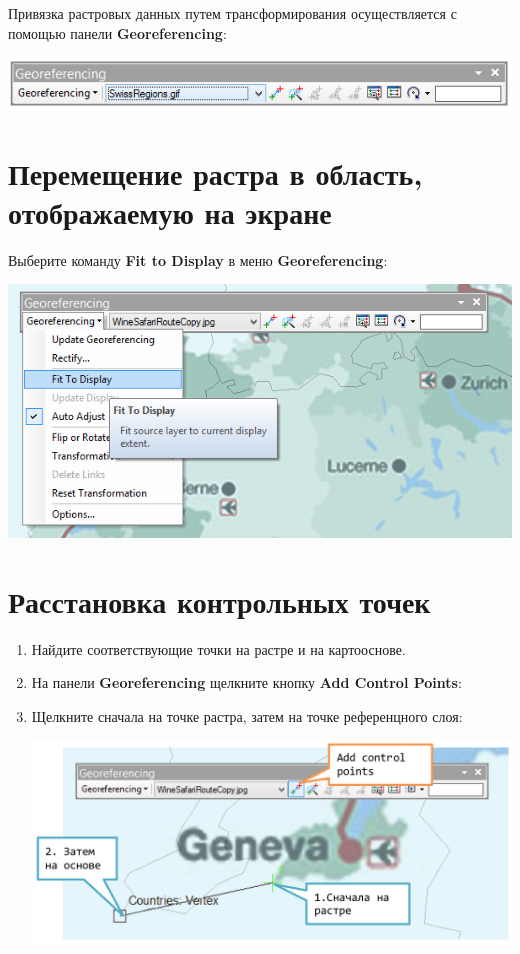 \documentclass[12pt,]{book}
\begin{document}
Привязка растровых данных путем трансформирования осуществляется с помощью панели \textbf{Georeferencing}:

\includegraphics{images/Appendix/image81.png}

\hypertarget{section-42}{%
\section{Перемещение растра в область, отображаемую на экране}\label{section-42}}

Выберите команду \textbf{Fit to Display} в меню \textbf{Georeferencing}:

\includegraphics{images/Appendix/image82.png}

\hypertarget{section-43}{%
\section{Расстановка контрольных точек}\label{section-43}}

\begin{enumerate}
\def\labelenumi{\arabic{enumi}.}
\item
  Найдите соответствующие точки на растре и на картооснове.
\item
  На панели \textbf{Georeferencing} щелкните кнопку \textbf{Add Control Points}:
\item
  Щелкните сначала на точке растра, затем на точке референцного слоя:

  \includegraphics{images/Appendix/image83.png}
\end{enumerate}
\end{document}
